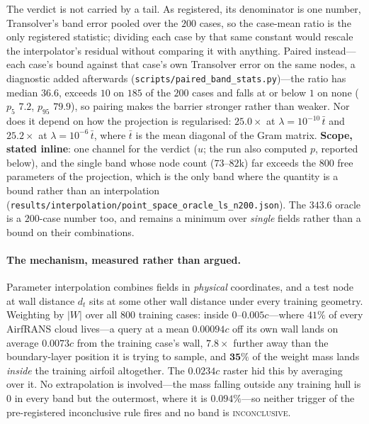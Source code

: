 The verdict is not carried by a tail. As registered, its denominator is one number,
Transolver's band error pooled over the $200$ cases, so the case-mean ratio is the only
registered statistic; dividing each case by that same constant would rescale the
interpolator's residual without comparing it with anything. Paired instead---each case's
bound against that case's own Transolver error on the same nodes, a diagnostic added
afterwards (\texttt{scripts\slash{}paired\_band\_stats.py})---the ratio has median $36.6$, exceeds
$10$ on $185$ of the $200$ cases and falls at or below $1$ on none ($p_{5}$ $7.2$, $p_{95}$
$79.9$), so pairing makes the barrier stronger rather than weaker. Nor does it depend on how
the projection is regularised: $25.0\times$ at $\lambda=10^{-10}\,\bar t$ and $25.2\times$
at $\lambda=10^{-6}\,\bar t$, where $\bar t$ is the mean diagonal of the Gram matrix.
\textbf{Scope, stated inline}: one channel for the verdict ($u$; the run also computed $p$,
reported below), and the single band whose node count
($73$--$82$k) far exceeds the $800$ free parameters of the projection, which is the only
band where the quantity is a bound rather than an interpolation
(\texttt{results\slash{}interpolation\slash{}point\_space\_oracle\_ls\_n200.json}). The $343.6$ oracle
is a $200$-case number too, and remains a minimum over \emph{single} fields rather than a
bound on their combinations.

\paragraph{The mechanism, measured rather than argued.} Parameter interpolation combines
fields in \emph{physical} coordinates, and a test node at wall distance $d_t$ sits at some
other wall distance under every training geometry. Weighting by $|W|$ over all $800$
training cases: inside $0$--$0.005c$---where $41\%$ of every AirfRANS cloud lives---a query
at a mean $0.00094c$ off its own wall lands on average $0.0073c$ from the training case's
wall, $\mathbf{7.8\times}$ further away than the boundary-layer position it is trying to
sample, and $\mathbf{35\%}$ of the weight mass lands \emph{inside} the training airfoil
altogether. The $0.0234c$ raster hid this by averaging over it. No extrapolation is
involved---the mass falling outside any training hull is $0$ in every band but the
outermost, where it is $0.094\%$---so neither trigger of the pre-registered inconclusive
rule fires and no band is \textsc{inconclusive}.

